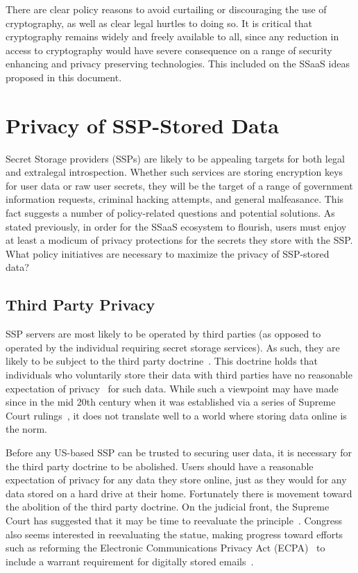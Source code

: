 There are clear policy reasons to avoid curtailing or discouraging the
use of cryptography, as well as clear legal hurtles to doing so. It is
critical that cryptography remains widely and freely available to all,
since any reduction in access to cryptography would have severe
consequence on a range of security enhancing and privacy preserving
technologies. This included on the SSaaS ideas proposed in this
document.

\section{Privacy of SSP-Stored Data}

Secret Storage providers (SSPs) are likely to be appealing targets for
both legal and extralegal introspection. Whether such services are
storing encryption keys for user data or raw user secrets, they will
be the target of a range of government information requests, criminal
hacking attempts, and general malfeasance. This fact suggests a number
of policy-related questions and potential solutions. As stated
previously, in order for the SSaaS ecosystem to flourish, users must
enjoy at least a modicum of privacy protections for the secrets they
store with the SSP. What policy initiatives are necessary to maximize
the privacy of SSP-stored data?

\subsection{Third Party Privacy}

SSP servers are most likely to be operated by third parties (as
opposed to operated by the individual requiring secret storage
services). As such, they are likely to be subject to the third party
doctrine~\cite{thompson-thirdparty}. This doctrine holds that
individuals who voluntarily store their data with third parties have
no reasonable expectation of privacy~\cite{scotus-katzvus} for such
data. While such a viewpoint may have made since in the mid 20th
century when it was established via a series of Supreme Court
rulings~\cite{scotus-usvmiller-privacy, scotus-smithvmaryland}, it
does not translate well to a world where storing data online is the
norm.

Before any US-based SSP can be trusted to securing user data, it is
necessary for the third party doctrine to be abolished. Users should
have a reasonable expectation of privacy for any data they store
online, just as they would for any data stored on a hard drive at
their home. Fortunately there is movement toward the abolition of the
third party doctrine. On the judicial front, the Supreme Court has
suggested that it may be time to reevaluate the
principle~\cite{scotus-usvjones}. Congress also seems interested in
reevaluating the statue, making progress toward efforts such as
reforming the Electronic Communications Privacy Act (ECPA)~\cite{ecpa}
to include a warrant requirement for digitally stored
emails~\cite{eff-ecpareform}.

